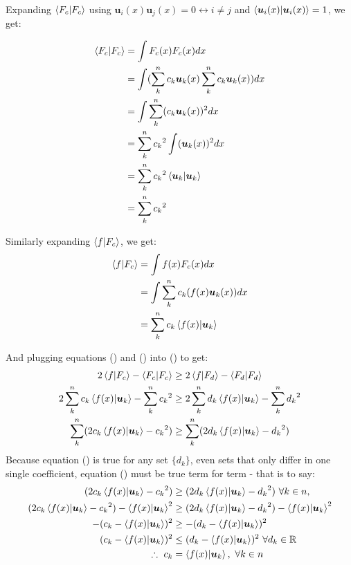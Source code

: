 \documentclass{article}
\newcommand{\B}[1]{\boldsymbol{#1}}
\newcommand*\R{\mathbb{R}}
\theoremstyle{definition}
\theoremstyle{remark}
\begin{document}
Expanding $\braket{F_c|F_c}$ using $\B{u}_i(x) \B{u}_j(x) = 0 \leftrightarrow i \neq j$ and $\braket{\B{u}_i(x) |\B{u}_i(x)} = 1$, we get:

\begin{align}
  \braket{F_c | F_c} &= \int F_c(x) F_c(x) dx \nonumber\\
  &= \int(\sum_k^n c_k \B{u}_k(x) \sum_k^n c_k \B{u}_k(x)) dx \nonumber\\
  &= \int \sum_k^n (c_k \B{u}_k(x)) ^2 dx \nonumber\\
  &=  \sum_k^n  {c_k}^2 \int  (\B{u}_k(x)) ^2 dx \nonumber\\
  &=  \sum_k^n {c_k}^2  \braket{\B{u}_k | \B{u}_k } \nonumber\\
  &=  \sum_k^n {c_k}^2 \label{eq:9}
\end{align}


Similarly expanding $\braket{f|F_c}$, we get:
\begin{align}
  \braket{f| F_c} &= \int f(x) F_c(x) dx \nonumber\\
  &= \int \sum_k^n c_k (f(x) \B{u}_k(x)) dx \nonumber\\
  &=  \sum_k^n c_k \braket{f(x)| \B{u}_k }  \label{eq:10}
\end{align}

And plugging equations () and () into () to get:
\begin{align}
    2\braket{f|F_c} - \braket{F_c|F_c} &\geq 2\braket{f|F_d} - \braket{F_d|F_d}   \nonumber\\
    2 \sum_k^n c_k \braket{f(x)| \B{u}_k } - \sum_k^n {c_k}^2 &\geq 2 \sum_k^n d_k \braket{f(x)| \B{u}_k } - \sum_k^n {d_k}^2 \nonumber\\
    \sum_k^n(2 c_k \braket{f(x)| \B{u}_k } - {c_k}^2) &\geq \sum_k^n(2 d_k \braket{f(x)| \B{u}_k } - {d_k}^2)  \label{eq:almost}
\end{align}
Because equation () is true for any set $\{d_k\}$, even sets that only differ 
in one single coefficient, equation () must be true term for term - that is to say:
\begin{align}
  (2 c_k \braket{f(x)| \B{u}_k } - {c_k}^2) &\geq (2 d_k \braket{f(x)| \B{u}_k } - {d_k}^2) ~ \forall k \in n, \\
  (2 c_k \braket{f(x)| \B{u}_k } - {c_k}^2) - \braket{f(x)| \B{u}_k }^2  &\geq (2 d_k \braket{f(x)| \B{u}_k } - {d_k}^2) - \braket{f(x)| \B{u}_k }^2 \nonumber\\
  -({c_k} - \braket{f(x)| \B{u}_k })^2  &\geq -({d_k} - \braket{f(x)| \B{u}_k })^2 \nonumber\\
  ({c_k} - \braket{f(x)| \B{u}_k })^2  &\leq ({d_k} - \braket{f(x)| \B{u}_k })^2 ~ \forall d_k \in \R \nonumber\\
  \therefore ~ c_k &= \braket{f(x)| \B{u}_k }, ~ \forall k \in n \label{eq:bestApproxEqn}
\end{align}
\end{document}
